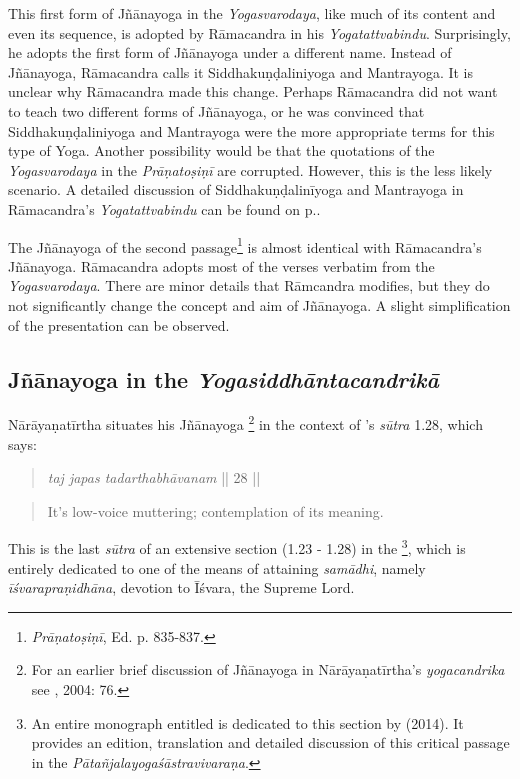 This first form of Jñānayoga in the \textit{Yogasvarodaya}, like much of its content and even its sequence, is adopted by Rāmacandra in his \textit{Yogatattvabindu}. Surprisingly, he adopts the first form of Jñānayoga under a different name. Instead of Jñānayoga, Rāmacandra calls it Siddhakuṇḍaliniyoga and Mantrayoga. It is unclear why Rāmacandra made this change. Perhaps Rāmacandra did not want to teach two different forms of Jñānayoga, or he was convinced that Siddhakuṇḍaliniyoga and Mantrayoga were the more appropriate terms for this type of Yoga. Another possibility would be that the quotations of the \textit{Yogasvarodaya} in the \textit{Prāṇatoṣiṇī} are corrupted. However, this is the less likely scenario. A detailed discussion of Siddhakuṇḍalinīyoga and Mantrayoga in Rāmacandra's \textit{Yogatattvabindu} can be found on p.\pageref{siddhayogaintro}.

The Jñānayoga of the second passage\footnote{\textit{Prāṇatoṣiṇī}, Ed. p. 835-837.} is almost identical with Rāmacandra's Jñānayoga. Rāmacandra adopts most of the verses verbatim from the \textit{Yogasvarodaya}. There are minor details that Rāmcandra modifies, but they do not significantly change the concept and aim of Jñānayoga. A slight simplification of the presentation can be observed. 

\subsection{Jñānayoga in the \textit{Yogasiddhāntacandrikā}}

Nārāyaṇatīrtha situates his Jñānayoga \footnote{For an earlier brief discussion of Jñānayoga in Nārāyaṇatīrtha's \textit{yogacandrika} see \citeauthor{penna2004}, 2004: 76.} in the context of 's \textit{sūtra} 1.28, which says:
\begin{quote} \textit{taj japas tadarthabhāvanam} || 28 || \end{quote}
\begin{quote} It's low-voice muttering; contemplation of its meaning. \end{quote}

This is the last \textit{sūtra} of an extensive section (1.23 - 1.28) in the \footnote{An entire monograph entitled  is dedicated to this section by \citeauthor{harimoto2014} (2014). It provides an edition, translation and detailed discussion of this critical passage in the \textit{Pātañjalayogaśāstravivaraṇa}.}, which is entirely dedicated to one of the means of attaining \textit{samādhi}, namely \textit{īśvarapraṇidhāna}, devotion to Īśvara, the Supreme Lord.

